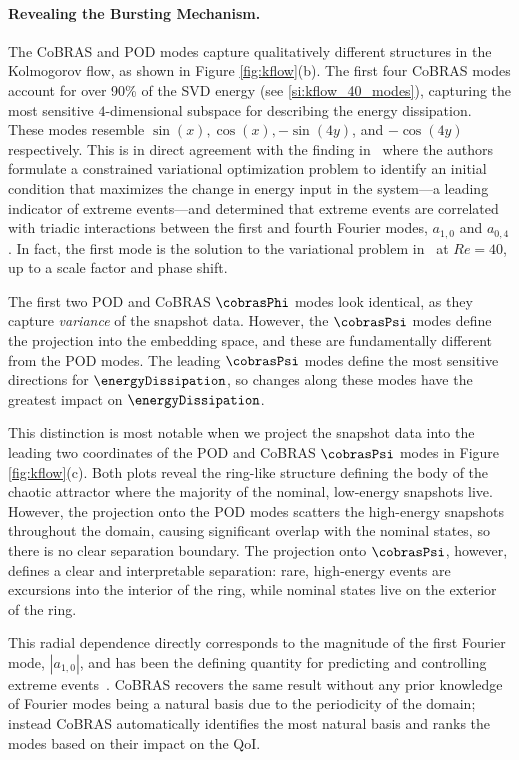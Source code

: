 \documentclass[twocolumn,10pt]{article}
\begin{document}
\paragraph{Revealing the Bursting Mechanism.}
The CoBRAS and POD modes capture qualitatively different structures in the Kolmogorov flow, as shown in Figure \ref{fig:kflow}(b).
The first four CoBRAS modes account for over 90\% of the SVD energy (see \ref{si:kflow_40_modes}), capturing the most sensitive $4$-dimensional subspace for describing the energy dissipation. These modes resemble $\sin(x), \cos(x), -\sin(4y)$, and $-\cos(4y)$ respectively.
%
This is in direct agreement with the finding in~\cite{farazmand2017a} where the authors formulate a constrained variational optimization problem to identify an initial condition that maximizes the change in energy input in the system---a leading indicator of extreme events---and determined that extreme events are correlated with triadic interactions between the first and fourth Fourier modes, $a_{1,0}$ and $a_{0,4}$. 
%
In fact, the first mode is the solution to the variational problem in~\cite{farazmand2017a} at $Re=40$, up to a scale factor and phase shift. 
%

The first two POD and CoBRAS $\cobrasPhi$ modes look identical, as they capture \textit{variance} of the snapshot data. 
%
However, the $\cobrasPsi$ modes define the projection into the embedding space, and these are fundamentally different from the POD modes.
%
The leading $\cobrasPsi$ modes define the most sensitive directions for $\energyDissipation$, so changes along these modes have the greatest impact on $\energyDissipation$. 

This distinction is most notable when we project the snapshot data into the leading two coordinates of the POD and CoBRAS $\cobrasPsi$ modes in Figure \ref{fig:kflow}(c). Both plots reveal the ring-like structure defining the body of the chaotic attractor where the majority of the nominal, low-energy snapshots live. However, the projection onto the POD modes scatters the high-energy snapshots throughout the domain, causing significant overlap with the nominal states, so there is no clear separation boundary. 
%
The projection onto $\cobrasPsi$, however, defines a clear and interpretable separation: rare, high-energy events are excursions into the interior of the ring, while nominal states live on the exterior of the ring. 

This radial dependence directly corresponds to the 
magnitude of the first Fourier mode, $|a_{1,0}|$, and has been the defining quantity for predicting and controlling extreme events~\cite{farazmand2017a, farazmand2019closed}. 
CoBRAS recovers the same result without any prior knowledge of Fourier modes being a natural basis due to the periodicity of the domain; instead {CoBRAS automatically identifies the most natural basis and ranks the modes based on their impact on the QoI}.
\end{document}
